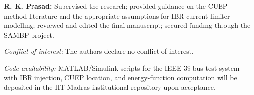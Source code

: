 \documentclass[11pt,a4paper]{article}
\begin{document}
\textbf{R. K. Prasad:} Supervised the research; provided guidance on
the CUEP method literature and the appropriate assumptions for IBR
current-limiter modelling; reviewed and edited the final manuscript;
secured funding through the SAMBP project.

\bigskip
\noindent\textit{Conflict of interest:} The authors declare no conflict
of interest.

\bigskip
\noindent\textit{Code availability:} MATLAB/Simulink scripts for the
IEEE 39-bus test system with IBR injection, CUEP location, and
energy-function computation will be deposited in the IIT Madras
institutional repository upon acceptance.
\end{document}
